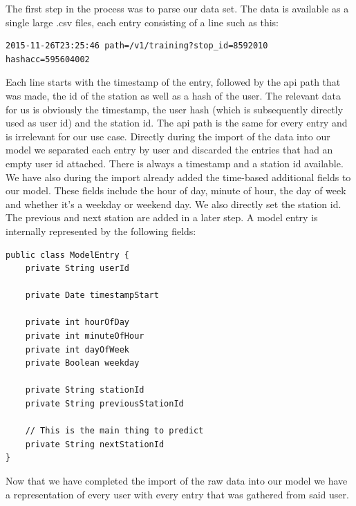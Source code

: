 The first step in the process was to parse our data set. The data is available as a single large .csv files, each entry consisting of a line such as this:
\begin{lstlisting}
2015-11-26T23:25:46	path=/v1/training?stop_id=8592010	hashacc=595604002
\end{lstlisting}
Each line starts with the timestamp of the entry, followed by the api path that was made, the id of the station as well as a hash of the user. The relevant data for us is obviously the timestamp, the user hash (which is subsequently directly used as user id) and the station id. The api path is the same for every entry and is irrelevant for our use case. Directly during the import of the data into our model we separated each entry by user and discarded the entries that had an empty user id attached. There is always a timestamp and a station id available. We have also during the import already added the time-based additional fields to our model. These fields include the hour of day, minute of hour, the day of week and whether it's a weekday or weekend day. We also directly set the station id. The previous and next station are added in a later step. A model entry is internally represented by the following fields:
\begin{lstlisting}
public class ModelEntry {
	private String userId
	
	private Date timestampStart
	
	private int hourOfDay
	private int minuteOfHour
	private int dayOfWeek
	private Boolean weekday
	
	private String stationId
	private String previousStationId
	
	// This is the main thing to predict
	private String nextStationId
}
\end{lstlisting}
Now that we have completed the import of the raw data into our model we have a representation of every user with every entry that was gathered from said user. 

